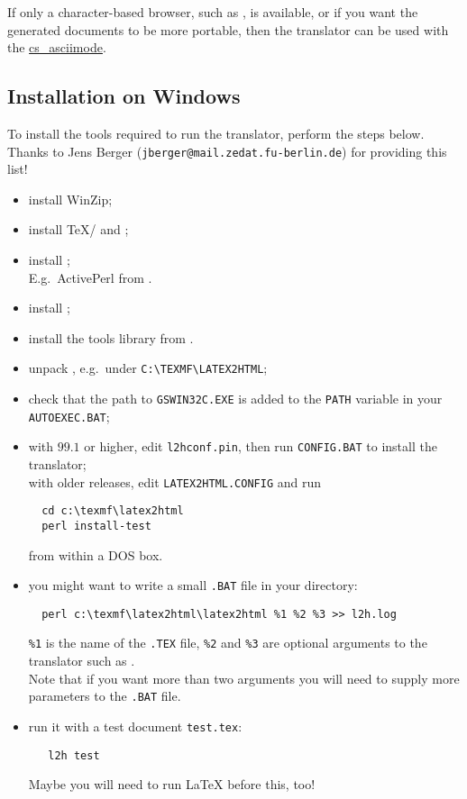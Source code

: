 If only a character-based browser, such as , is available, 
or if you want the generated documents to be more portable, 
then the translator can be used with the  
\hyperref{option}{option (see Section~}{)}{cs_asciimode}. 


\subsection{Installation on Windows}
\label{windowsinst}
To install the tools required to run the translator, perform the steps
below. Thanks to Jens Berger (\texttt{jberger@mail.zedat.fu-berlin.de})
for providing this list!
\begin{itemize}
\item install {WinZip};
\item install \TeX/\LaTeXe{} and ;
\item install \Perl{};\\
   E.g.\ {ActivePerl} from \ActiveStateURL.
\item install ;
\item install the  tools library from \NetpbmWinURL.
\item unpack \latextohtml{}, e.g.\ under \verb|C:\TEXMF\LATEX2HTML|;
\item check that the path to \texttt{GSWIN32C.EXE} is added to the
  \texttt{PATH} variable in your \texttt{AUTOEXEC.BAT};
\item with \latextohtml{} $99.1$ or higher, edit \texttt{l2hconf.pin},
  then run \texttt{CONFIG.BAT} to install the translator;\\
  with older releases, edit \texttt{LATEX2HTML.CONFIG} and run
  \begin{verbatim}
  cd c:\texmf\latex2html
  perl install-test
  \end{verbatim}
  from within a DOS box.
\item you might want to write a small \texttt{.BAT} file in your
  \latextohtml{} directory:
  \begin{verbatim}
  perl c:\texmf\latex2html\latex2html %1 %2 %3 >> l2h.log
  \end{verbatim}
  \texttt{\%1} is the name of the \texttt{.TEX} file,
  \texttt{\%2} and \texttt{\%3} are optional arguments to the
  translator such as .\\
  Note that if you want more than two arguments you will need
  to supply more parameters to the \texttt{.BAT} file.
\item run it with a test document \texttt{test.tex}:
  \begin{verbatim}
   l2h test
  \end{verbatim}
  Maybe you will need to run \LaTeX{} before this, too!
\end{itemize}


